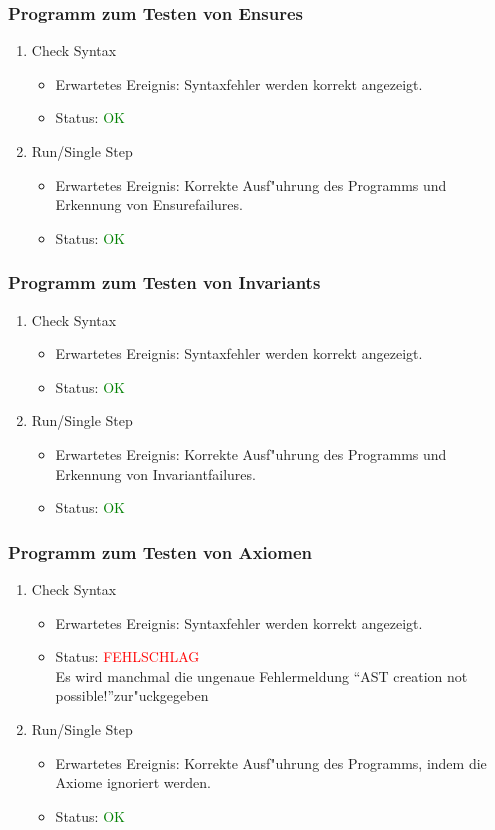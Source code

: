 \subsubsection{Programm zum Testen von Ensures}
\begin{enumerate}
\item Check Syntax
\begin{itemize}
\item Erwartetes Ereignis: Syntaxfehler werden korrekt angezeigt.
\item Status: \textcolor{green}{OK}
\end{itemize}
\item Run/Single Step
\begin{itemize}
\item Erwartetes Ereignis: Korrekte Ausf"uhrung des Programms und Erkennung von Ensurefailures.
\item Status: \textcolor{green}{OK}
\end{itemize}
\end{enumerate}
\subsubsection{Programm zum Testen von Invariants}
\begin{enumerate}
\item Check Syntax
\begin{itemize}
\item Erwartetes Ereignis: Syntaxfehler werden korrekt angezeigt.
\item Status: \textcolor{green}{OK}
\end{itemize}
\item Run/Single Step
\begin{itemize}
\item Erwartetes Ereignis: Korrekte Ausf"uhrung des Programms und Erkennung von Invariantfailures.
\item Status: \textcolor{green}{OK}
\end{itemize}
\end{enumerate}
\subsubsection{Programm zum Testen von Axiomen}
\begin{enumerate}
\item Check Syntax
\begin{itemize}
\item Erwartetes Ereignis: Syntaxfehler werden korrekt angezeigt.
\item Status: \textcolor{red}{FEHLSCHLAG} \\
Es wird manchmal die ungenaue Fehlermeldung "`AST creation not possible!"'zur"uckgegeben
\end{itemize}
\item Run/Single Step
\begin{itemize}
\item Erwartetes Ereignis: Korrekte Ausf"uhrung des Programms, indem die Axiome ignoriert werden.
\item Status: \textcolor{green}{OK}
\end{itemize}
\end{enumerate}

